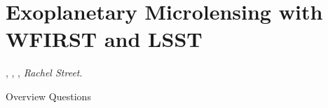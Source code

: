 %
%
%
%

\section{Exoplanetary Microlensing with WFIRST and LSST}
\def\secname{\chpname:microlensing}\label{sec:\secname}

,
,
,
{\it Rachel Street}.

Overview Questions  %

